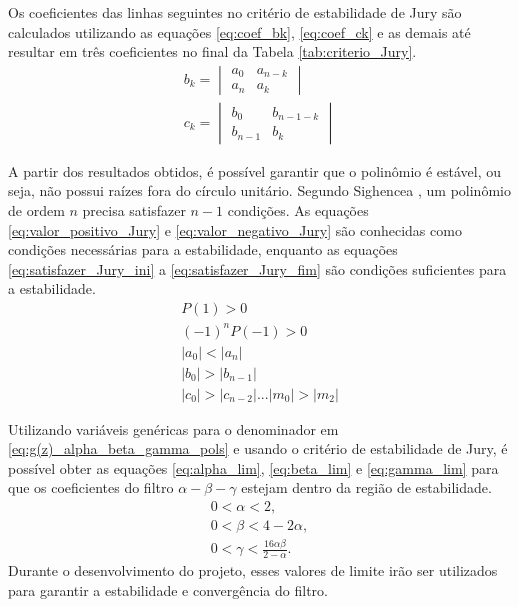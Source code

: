 Os coeficientes das linhas seguintes no critério de estabilidade de Jury são calculados utilizando as equações \eqref{eq:coef_bk}, \eqref{eq:coef_ck} e as demais até resultar em três coeficientes no final da Tabela \ref{tab:criterio_Jury}.
\begin{align}
b_k = \begin{vmatrix}
a_0 & a_{n-k} \\
a_n & a_k
\end{vmatrix} \label{eq:coef_bk} \\
c_k = \begin{vmatrix}
b_0 & b_{n-1-k} \\
b_{n-1} & b_k
\end{vmatrix} \label{eq:coef_ck}
\end{align}

A partir dos resultados obtidos, é possível garantir que o polinômio é estável, ou seja, não possui raízes fora do círculo unitário.
Segundo Sighencea \citeyear{sighencea2022}, um polinômio de ordem $n$ precisa satisfazer $n-1$ condições.
As equações \eqref{eq:valor_positivo_Jury} e \eqref{eq:valor_negativo_Jury} são conhecidas como condições necessárias para a estabilidade,
enquanto as equações \eqref{eq:satisfazer_Jury_ini} a \eqref{eq:satisfazer_Jury_fim} são condições suficientes para a estabilidade.
\begin{align}
    P(1) > 0 \label{eq:valor_positivo_Jury} \\
    (-1)^n P(-1) > 0 \label{eq:valor_negativo_Jury} \\
    \left|a_0\right| < \left|a_n\right| \label{eq:satisfazer_Jury_ini} \\
    \left|b_0\right| > \left|b_{n-1}\right| \\
    \left|c_0\right| > \left|c_{n-2}\right| ... \left|m_0\right| > \left|m_2\right| \label{eq:satisfazer_Jury_fim}
\end{align}

Utilizando variáveis genéricas para o denominador em \eqref{eq:g(z)_alpha_beta_gamma_pols} e usando o critério de estabilidade de Jury, é possível obter as equações \eqref{eq:alpha_lim}, \eqref{eq:beta_lim} e \eqref{eq:gamma_lim} para que os coeficientes do filtro $\alpha-\beta-\gamma$ estejam dentro da região de estabilidade.
\begin{align}
0<\alpha<2,                             \label{eq:alpha_lim} \\
0<\beta<4-2\alpha,                      \label{eq:beta_lim}  \\
0<\gamma<\frac{16\alpha\beta}{2-\alpha}. \label{eq:gamma_lim}
\end{align}
Durante o desenvolvimento do projeto, esses valores de limite irão ser utilizados para garantir a estabilidade e convergência do filtro.
